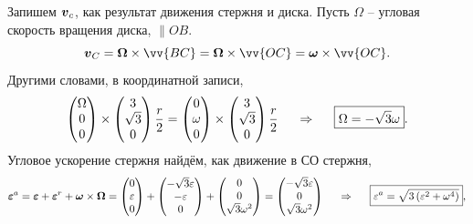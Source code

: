 Запишем $\mbox{\boldmath $v$}_c$, как результат движения стержня и диска. Пусть $\Omega$ -- угловая скорость вращения диска, $\parallel OB$.
$$
    \vc{v}_C = \vc{\Omega} \times \vv{BC} = \vc{\Omega} \times \vv{OC} =
    \vc{\omega} \times \vv{OC}.
$$
Другими словами, в координатной записи,
$$
    \begin{pmatrix}
        \Omega \\ 0 \\ 0
    \end{pmatrix} \times \begin{pmatrix}
        3 \\ \sqrt{3} \\ 0
    \end{pmatrix} \frac{r}{2}  = \begin{pmatrix}
        0 \\ \omega \\ 0
    \end{pmatrix} \times \begin{pmatrix}
        3 \\ \sqrt{3} \\ 0
    \end{pmatrix} \frac{r}{2}
    \hspace{0.5cm} \Rightarrow \hspace{0.5cm} 
    \boxed{\Omega = - \sqrt{3} \omega}.
$$
Угловое ускорение стержня найдём, как движение в СО стержня,
$$
    \mbox{\boldmath $\varepsilon$}^a = \mbox{\boldmath $\varepsilon$} + \mbox{\boldmath $\varepsilon$}^r + \mbox{\boldmath $\omega$} \times \mbox{\boldmath $\Omega$} =
    \begin{pmatrix}
        0 \\ \varepsilon \\ 0
    \end{pmatrix} +
    \begin{pmatrix}
        -\sqrt{3}\varepsilon \\ - \varepsilon \\ 0
    \end{pmatrix} +
    \begin{pmatrix}
        0 \\0 \\ \sqrt{3} \omega^2
    \end{pmatrix} = \begin{pmatrix}
        - \sqrt{3} \varepsilon \\ 0\\ \sqrt{3} \omega^2
    \end{pmatrix}
    \hspace{0.5cm} \Rightarrow \hspace{0.5cm} 
    \boxed{\varepsilon^a = \sqrt{3\left(\varepsilon^2 + \omega^4\right)}},
$$
